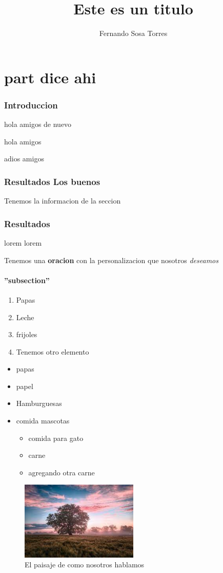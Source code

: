 \documentclass[10pt,a4paper]{article}
\title{Este es un titulo}
\author{Fernando Sosa Torres}
\begin{document}
\maketitle
\part{part dice ahi}
\section{Introduccion} 
hola amigos de nuevo
\blindtext

hola amigos

adios amigos
\section{Resultados Los buenos}
Tenemos la informacion de la seccion
\section{Resultados}
lorem lorem

Tenemos una \textbf{oracion} con la personalizacion que nosotros \textit{deseamos}
\subsection{''subsection''}

\begin{enumerate}
	\item Papas
	\item Leche
	\item frijoles
	\item Tenemos otro elemento
\end{enumerate}
\begin{itemize}
	\item papas
	\item papel
	\item Hamburguesas
	\item comida mascotas
	\begin{itemize}
		\item comida para gato
		\item carne
		\item agregando otra carne
	\end{itemize}
\end{itemize}

\begin{figure}[H]
\centering
\includegraphics[width=0.5\textwidth]{imagen}
\caption{El paisaje de como nosotros hablamos}
\label{paisaje}
\end{figure}
\end{document}
